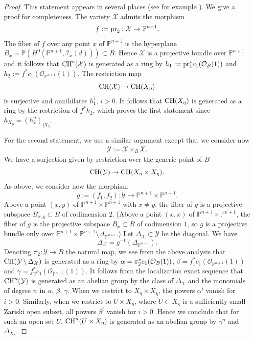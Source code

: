 \documentclass[10pt]{article}
\begin{document}
\begin{proof} This statement appears in several places (see for example \cite{voisinkyoto}). We give a proof for completeness. The variety $\mathcal{X}$ admits the morphism
$$ f:={\rm pr}_2:\mathcal{X}\rightarrow \mathbb{P}^{n+1}.$$
The fiber of $f$ over any point $x$ of $ \mathbb{P}^{n+1}$ is the hyperplane $B_x=\mathbb{P}(H^0(\mathbb{P}^{n+1},\mathcal{I}_{x}(d)))\subset B$. Hence $\mathcal{X}$ is a projective bundle over $\mathbb{P}^{n+1}$ and it follows that ${\rm CH}^*(\mathcal{X})$ is generated as a ring  by $h_1:={\rm pr}_1^*c_1(\mathcal{O}_B(1))$ and $h_2:=f^*c_1(\mathcal{O}_{\mathbb{P}^{n+1}}(1))$. The restriction map
$${\rm CH}(\mathcal{X})\rightarrow  {\rm CH}(X_{\eta})$$
is surjective and annihilates $h_1^i,\,i>0$. It follows that ${\rm CH}(X_{\eta})$ is generated as a ring by  the restriction of $f^*h_2$, which proves the first statement  since $h_{X_{\eta}}=(h_2^n)_{\mid X_{\eta}}$.


For the second statement, we use a similar argument except that we consider now
\begin{eqnarray} \label{eqpourY}\mathcal{Y}:=\mathcal{X}\times_{B}\mathcal{X}.\end{eqnarray}
We  have  a surjection given by restriction over the generic point of $B$
$${\rm CH}(\mathcal{Y})\rightarrow {\rm CH}(X_{\eta}\times X_{\eta}).$$
As above, we consider now the morphism
$$g:=(f_1,f_2):\mathcal{Y}\rightarrow\mathbb{P}^{n+1}\times \mathbb{P}^{n+1}.$$
Above a point  $(x,y)$ of $ \mathbb{P}^{n+1}\times \mathbb{P}^{n+1}$ with $x\not=y$, the fiber of $g$ is a projective subspace $B_{x,y}\subset B$ of codimension $2$. (Above a point $(x,x)$ of $ \mathbb{P}^{n+1}\times \mathbb{P}^{n+1}$, the fiber of $g$ is the projective subspace $B_{x}\subset B$ of codimension $1$, so $g$ is a projective bundle only over $\mathbb{P}^{n+1}\times \mathbb{P}^{n+1}\setminus \Delta_{\mathbb{P}^{n+1}}$.)
Let $\Delta_{\mathcal{X}}\subset \mathcal{Y}$ be the diagonal. We have
$$\Delta_{\mathcal{X}}=g^{-1}(\Delta_{ \mathbb{P}^{n+1}}).$$
Denoting $\pi_2:\mathcal{Y}\rightarrow B$ the natural map, we see from the above analysis that ${\rm CH}(\mathcal{Y}\setminus \Delta_{\mathcal{X}}) $ is generated as a ring by
$\alpha={\rm \pi}_2^* c_1(\mathcal{O}_B(1))$,  $\beta=f_1^*c_1(\mathcal{O}_{\mathbb{P}^{n+1}}(1))$ and $\gamma=f_2^*c_1(\mathcal{O}_{\mathbb{P}^{n+1}}(1))$. It follows from the localization exact sequence that ${\rm CH}^n(\mathcal{Y})$ is generated as an abelian group by the class of $\Delta_{\mathcal{X}}$ and the monomials of degree $n$ in $\alpha,\,\beta,\,\gamma$.
When we restrict to $X_{\eta}\times X_{\eta}$, the powers $\alpha^i$  vanish for $i>0$. Similarly, when we restrict to
$U\times X_{\eta}$, where $U\subset X_{\eta}$ is a sufficiently small Zariski open subset, all powers $\beta^i$  vanish for $i>0$. Hence we conclude that for such an open set $U$,  ${\rm CH}^n(U\times X_{\eta})$ is generated as an abelian group by $\gamma^n$ and $\Delta_{X_{\eta}}$.
\end{proof}
\end{document}
